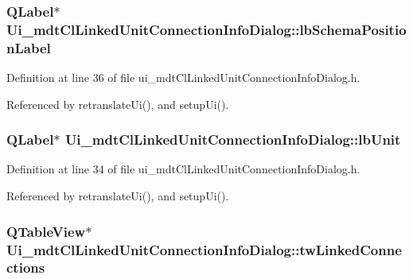 \hypertarget{class_ui__mdt_cl_linked_unit_connection_info_dialog_aebfcbb0c37f6c6db5d581413a4f8e532}{
\subsubsection[{lb\-Schema\-Position\-Label}]{\setlength{\rightskip}{0pt plus 5cm}Q\-Label$\ast$ Ui\-\_\-mdt\-Cl\-Linked\-Unit\-Connection\-Info\-Dialog\-::lb\-Schema\-Position\-Label}}\label{class_ui__mdt_cl_linked_unit_connection_info_dialog_aebfcbb0c37f6c6db5d581413a4f8e532}


Definition at line 36 of file ui\-\_\-mdt\-Cl\-Linked\-Unit\-Connection\-Info\-Dialog.\-h.



Referenced by retranslate\-Ui(), and setup\-Ui().

\hypertarget{class_ui__mdt_cl_linked_unit_connection_info_dialog_a8e6d068442250513739eef535668c7c3}{
\subsubsection[{lb\-Unit}]{\setlength{\rightskip}{0pt plus 5cm}Q\-Label$\ast$ Ui\-\_\-mdt\-Cl\-Linked\-Unit\-Connection\-Info\-Dialog\-::lb\-Unit}}\label{class_ui__mdt_cl_linked_unit_connection_info_dialog_a8e6d068442250513739eef535668c7c3}


Definition at line 34 of file ui\-\_\-mdt\-Cl\-Linked\-Unit\-Connection\-Info\-Dialog.\-h.



Referenced by retranslate\-Ui(), and setup\-Ui().

\hypertarget{class_ui__mdt_cl_linked_unit_connection_info_dialog_a3a76fb485a339f8a47a4a148f5534f42}{
\subsubsection[{tw\-Linked\-Connections}]{\setlength{\rightskip}{0pt plus 5cm}Q\-Table\-View$\ast$ Ui\-\_\-mdt\-Cl\-Linked\-Unit\-Connection\-Info\-Dialog\-::tw\-Linked\-Connections}}\label{class_ui__mdt_cl_linked_unit_connection_info_dialog_a3a76fb485a339f8a47a4a148f5534f42}


